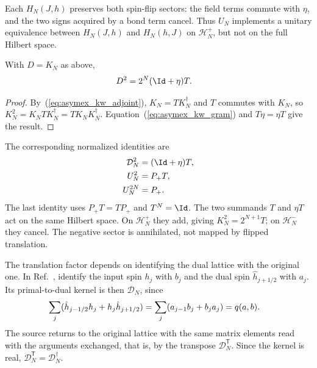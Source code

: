 Each $H_N(J,h)$ preserves both spin-flip sectors: the field terms
commute with $\eta$, and the two signs acquired by a bond term cancel.
Thus $U_N$ implements a unitary equivalence between $H_N(J,h)$ and
$H_N(h,J)$ on $\mathcal H_N^+$, but not on the full Hilbert space.

\begin{corollary}
    \label{cor:asymex_kw_square}
    \leanok
    With $D=K_N$ as above,
    \begin{align}
        D^2 & =2^N(\Id+\eta)T.
        \label{eq:asymex_kw_fusion}
    \end{align}
\end{corollary}

\begin{proof}
    \leanok
    By~(\ref{eq:asymex_kw_adjoint}), $K_N=TK_N^\dagger$ and $T$
    commutes with $K_N$, so $K_N^2=K_NTK_N^\dagger=TK_NK_N^\dagger$.
    Equation~(\ref{eq:asymex_kw_gram}) and $T\eta=\eta T$ give the
    result.
\end{proof}

The corresponding normalized identities are
\begin{align}
    \mathcal D_N^2 & =(\Id+\eta)T,
    \notag                         \\
    U_N^2          & =P_+T,
    \notag                         \\
    U_N^{2N}       & =P_+.
    \label{eq:asymex_kw_normalized_square}
\end{align}
The last identity uses $P_+T=TP_+$ and $T^N=\Id$.
The two summands $T$ and $\eta T$ act on the same Hilbert space.
On $\mathcal H_N^+$ they add, giving $K_N^2=2^{N+1}T$; on
$\mathcal H_N^-$ they cancel. The negative sector is annihilated,
not mapped by flipped translation.

The translation factor depends on identifying the dual lattice with
the original one. In Ref.~\cite{Aasen2016Topological}, identify the
input spin $h_j$ with $b_j$ and the dual spin
$\hat h_{j+1/2}$ with $a_j$. Its primal-to-dual kernel is then
$\mathcal D_N$, since
\begin{align}
    \sum_j(\hat h_{j-1/2}h_j+h_j\hat h_{j+1/2})
     & =\sum_j(a_{j-1}b_j+b_ja_j)=q(a,b).
    \notag
\end{align}
The source returns to the original lattice with the same matrix
elements read with the arguments exchanged, that is, by the transpose
$\mathcal D_N^{\mathsf T}$. Since the kernel is real,
$\mathcal D_N^{\mathsf T}=\mathcal D_N^\dagger$.

